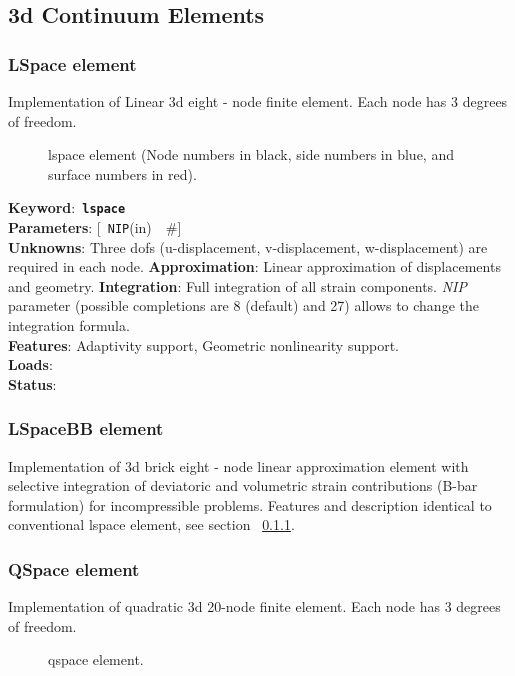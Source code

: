 \documentclass[a4paper]{article}
\newcommand{\descitem}[1]{{\noindent \bf #1}:}
\newcommand{\elemkeyword}[1]{\descitem{Keyword}~{\bf \texttt{#1}}}
\newcommand{\elemparam}[2]{{{\texttt{#1}\tiny (#2)}~~\#}}
\newcommand{\optelemparam}[2]{{[~\elemparam{#1}{#2}]}}
\newcommand{\param}[1]{{\em #1}}
\begin{document}
\subsection{3d Continuum Elements}
\subsubsection{LSpace element}
\label{lspacesect}
Implementation of Linear 3d  eight - node 
finite element. Each node has 3 degrees of freedom.
\begin{figure}[tb]
 \centering
 \begin{makeimage}
  
 \end{makeimage}
 \caption{lspace element (Node numbers in black, side numbers in blue,
 and surface numbers in red).}
\end{figure}

\elemkeyword{lspace}\\
\descitem{Parameters} \optelemparam{NIP}{in}\\
\descitem{Unknowns}
Three dofs (u-displacement, v-displacement, w-displacement) are required in each node.
\descitem{Approximation} Linear approximation of displacements and
geometry.
\descitem{Integration}
Full integration of all strain components.
\param{NIP} parameter (possible completions are 8 (default) and 27)
allows to change the integration formula.\\
\descitem{Features} Adaptivity support, Geometric nonlinearity support.\\
\descitem{Loads} \\
\descitem{Status} 

\subsubsection{LSpaceBB element}
Implementation of 3d brick  eight - node 
linear approximation element with selective integration of deviatoric and volumetric 
strain contributions (B-bar formulation) for incompressible problems. 
Features and description identical to conventional lspace element, see section ~\ref{lspacesect}.

\subsubsection{QSpace element}
Implementation of quadratic 3d  20-node 
finite element. Each node has 3 degrees of freedom.
\begin{figure}[tb]
 \centering
 \begin{makeimage}
  \raisebox{-0.5\height}{}
  \raisebox{-0.5\height}{}
 \end{makeimage}
 \caption{qspace element.}
\end{figure}
\end{document}
